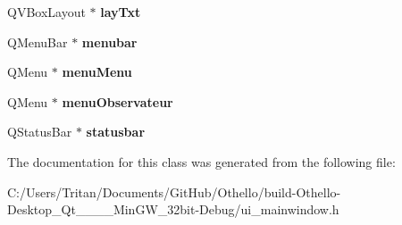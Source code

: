 \begin{DoxyCompactItemize}
\item 
\hypertarget{class_ui___main_window_a2294ef42fad02224109f29a1fc32f3d4}{}Q\+V\+Box\+Layout $\ast$ {\bfseries lay\+Txt}\label{class_ui___main_window_a2294ef42fad02224109f29a1fc32f3d4}

\item 
\hypertarget{class_ui___main_window_a734b1d3bb71c1b8e1ea01b7fa4344fce}{}Q\+Menu\+Bar $\ast$ {\bfseries menubar}\label{class_ui___main_window_a734b1d3bb71c1b8e1ea01b7fa4344fce}

\item 
\hypertarget{class_ui___main_window_a260179a86d33bea0c85c5a1424e40beb}{}Q\+Menu $\ast$ {\bfseries menu\+Menu}\label{class_ui___main_window_a260179a86d33bea0c85c5a1424e40beb}

\item 
\hypertarget{class_ui___main_window_adfbbb321d68c8939a648b3bb09ab7000}{}Q\+Menu $\ast$ {\bfseries menu\+Observateur}\label{class_ui___main_window_adfbbb321d68c8939a648b3bb09ab7000}

\item 
\hypertarget{class_ui___main_window_a07519bbb9a350befd6feb4e84ef299fd}{}Q\+Status\+Bar $\ast$ {\bfseries statusbar}\label{class_ui___main_window_a07519bbb9a350befd6feb4e84ef299fd}

\end{DoxyCompactItemize}


The documentation for this class was generated from the following file\+:\begin{DoxyCompactItemize}
\item 
C\+:/\+Users/\+Tritan/\+Documents/\+Git\+Hub/\+Othello/build-\/\+Othello-\/\+Desktop\+\_\+\+Qt\+\_\+\_\+\_\+\_\+\+Min\+G\+W\+\_\+32bit-\/\+Debug/ui\+\_\+mainwindow.\+h\end{DoxyCompactItemize}
